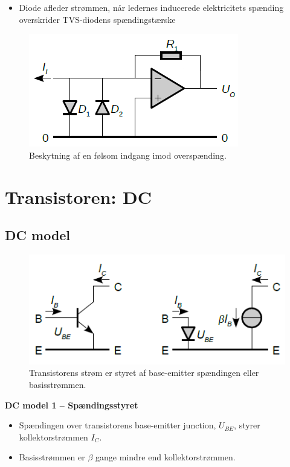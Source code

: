 \documentclass[danish]{article}
\begin{document}
\begin{itemize}
	\item Diode afleder strømmen, når ledernes inducerede elektricitets spænding overskrider TVS-diodens spændingstærske
\end{itemize}

\begin{figure} [H]
	\centering
	\includegraphics[width=0.6\linewidth]{graphics/diodebeskyt}
	\caption{Beskytning af en følsom indgang imod overspænding.}
	\label{fig:diodebeskyt}
\end{figure}

\newpage
\section{Transistoren: DC}

\subsection{DC model}

\begin{figure} [H]
	\centering
	\includegraphics[width=0.8\linewidth]{graphics/transistor_DCmodel}
	\caption{Transistorens strøm er styret af base-emitter spændingen eller basisstrømmen.}
	\label{fig:transistor_DCmodel}
\end{figure}

\textbf{DC model 1 – Spændingsstyret}
\begin{itemize}
	\item Spændingen over transistorens base-emitter junction, $U_{BE}$, styrer kollektorstrømmen $I_C$.
	\item Basisstrømmen er ${\beta}$ gange mindre end kollektorstrømmen.
\end{itemize}
\end{document}
